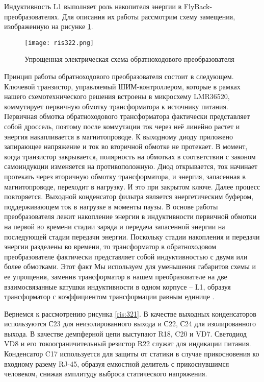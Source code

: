 Индуктивность L1 выполняет роль накопителя энергии в FlyBack-преобразователях.
Для описания их работы рассмотрим схему замещения, изображенную на рисунке \ref{ris:322}.

\begin{figure}[H]
    \centering
    \texttt{[image: ris322.png]}
    \caption{Упрощенная электрическая схема обратноходового преобразователя}
    \label{ris:322}
\end{figure}

Принцип работы обратноходового преобразователя состоит в следующем. Ключевой транзистор, 
управляемый ШИМ-контроллером, которые в рамках нашего схемотехнического решения встроены
в микросхему LMR36520, коммутирует первичную обмотку трансформатора к источнику питания.
Первичная обмотка обратноходового трансформатора фактически представляет собой дроссель, 
поэтому после коммутации ток через неё линейно растет и энергия накапливается в магнитопроводе. 
К выходному диоду приложено запирающее напряжение и ток во вторичной обмотке не протекает. 
В момент, когда транзистор закрывается, полярность на обмотках в соответствии с законом 
самоиндукции изменяется на противоположную. Диод открывается, ток начинает протекать через
вторичную обмотку трансформатора, и энергия, запасенная в магнитопроводе, переходит в нагрузку. 
И это при закрытом ключе. Далее процесс повторяется. Выходной конденсатор фильтра является 
энергетическим буфером, поддерживающем ток в нагрузке в моменты паузы.
В основе работы преобразователя лежит накопление энергии в индуктивности первичной обмотки 
на первой во времени стадии заряда и передача запасенной энергии на последующей стадии 
передачи энергии. Поскольку стадии накопления и передачи энергии разделены во времени, 
то трансформатор в обратноходовом преобразователе фактически представляет собой индуктивностью 
с двумя или более обмотками. Этот факт Мы используем для уменьшения габаритов схемы и ее упрощения,
заменив трансформатор в нашем преобразователе на две взаимосвязанные катушки индуктивности в 
одном корпусе -- L1, образуя трансформатор с коэффициентом трансформации равным единице
\cite{PowerElectronic:FlyBack} 
\cite{Würth Elektronik:Application Note}
\cite{DC-DC_Book:Recom}.

Вернемся к рассмотрению рисунка \ref{ris:321}. В качестве выходных конденсаторов используются
С23 для неизолированного выхода и С22, С24 для изолированного выхода. В качестве демпферной цепи 
выступают R18, C20 и VD7. Светодиод VD8 и его токоограничительный резистор R22 служат для 
индикации питания. Конденсатор C17 используется для защиты от статики в случае прикосновения ко 
входному разему RJ-45, образуя емкостной делитель с прикоснувшимся человеком, снижая амплитуду 
выброса статического напряжения. 

